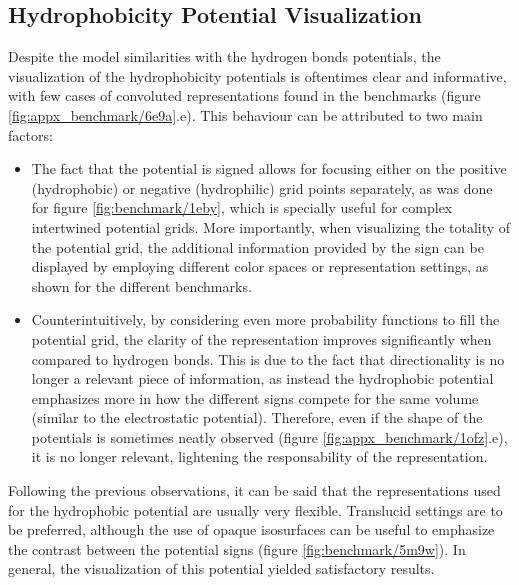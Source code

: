   \subsection{Hydrophobicity Potential Visualization}
    Despite the model similarities with the hydrogen bonds potentials, the visualization of the hydrophobicity potentials is oftentimes clear and informative, with few cases of convoluted representations found in the benchmarks (figure \ref{fig:appx_benchmark/6e9a}.e). This behaviour can be attributed to two main factors:

    \begin{itemize}
      \item The fact that the potential is signed allows for focusing either on the positive (hydrophobic) or negative (hydrophilic) grid points separately, as was done for figure \ref{fig:benchmark/1eby}, which is specially useful for complex intertwined potential grids. More importantly, when visualizing the totality of the potential grid, the additional information provided by the sign can be displayed by employing different color spaces or representation settings, as shown for the different benchmarks.

      \item Counterintuitively, by considering even more probability functions to fill the potential grid, the clarity of the representation improves significantly when compared to hydrogen bonds. This is due to the fact that directionality is no longer a relevant piece of information, as instead the hydrophobic potential emphasizes more in how the different signs compete for the same volume (similar to the electrostatic potential). Therefore, even if the shape of the potentials is sometimes neatly observed (figure \ref{fig:appx_benchmark/1ofz}.e), it is no longer relevant, lightening the responsability of the representation.
    \end{itemize}

    Following the previous observations, it can be said that the representations used for the hydrophobic potential are usually very flexible. Translucid settings are to be preferred, although the use of opaque isosurfaces can be useful to emphasize the contrast between the potential signs (figure \ref{fig:benchmark/5m9w}). In general, the visualization of this potential yielded satisfactory results.


